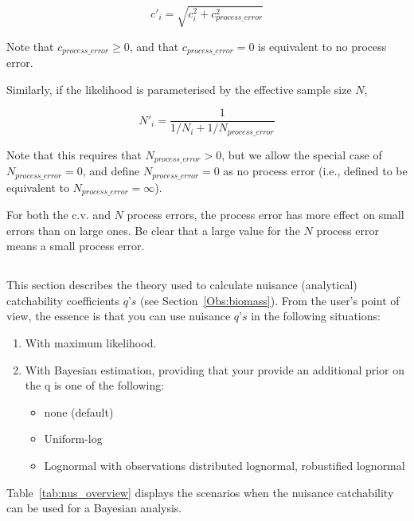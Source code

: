 {{{{\begin{equation}
  c'_i  = \sqrt {c_i^2  + c_{process\_error}^2 } 
\end{equation}

Note that $c_{process\_ error} \ge 0$, and that $c_{process\_ error} = 0$ is equivalent to no process error.

Similarly, if the likelihood is parameterised by the effective sample size $N$,

\begin{equation}
 N'_i  = \frac{1}{1 / {N_i}+ 1 / N_{process\_error}}
\end{equation}

Note that this requires that $N_{process\_ error} > 0$, but we allow the special case of $N_{process\_ error}=0$, and define $N_{process\_ error}=0$ as no process error (i.e., defined to be equivalent to $N_{process\_ error}=\infty$). 

For both the c.v. and $N$ process errors, the process error has more effect on small errors than on large ones. Be clear that a large value for the $N$ process error means a small process error.

\subsection{}\label{subsec:nuisance}
This section describes the theory used to calculate nuisance (analytical) catchability coefficients $q’s$ (see Section~\ref{Obs:biomass}). From the user's point of view, the essence is that you can use nuisance $q’s$ in the following situations:
\begin{enumerate}
	\item With maximum likelihood.
	\item With Bayesian estimation, providing that your provide an additional prior on the q is one of the following:
		\begin{itemize} 
			\item none (default)
			\item Uniform-log
			\item Lognormal with observations distributed lognormal, robustified lognormal
		\end{itemize}
\end{enumerate}
Table~\ref{tab:nus_overview} displays the scenarios when the nuisance catchability can be used for a Bayesian analysis.

}}}}
